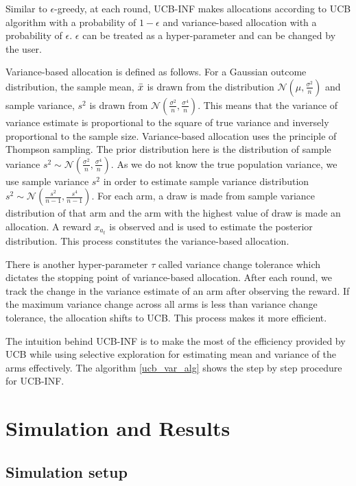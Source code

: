 \documentclass[12pt, letterpaper]{article}
\begin{document}
Similar to $\epsilon$-greedy, at each round, UCB-INF makes allocations according to UCB algorithm with a probability of $1-\epsilon$ and variance-based allocation with a probability of $\epsilon$. $\epsilon$ can be treated as a hyper-parameter and can be changed by the user.

Variance-based allocation is defined as follows. For a Gaussian outcome distribution, the sample mean, $\Bar{x}$ is drawn from the distribution $\mathcal{N}(\mu, \frac{\sigma^2}{n})$ and sample variance, $s^2$ is drawn from $\mathcal{N}( \frac{\sigma^2}{n}, \frac{\sigma^4}{n})$. This means that the variance of variance estimate is proportional to the square of true variance and inversely proportional to the sample size. Variance-based allocation uses the principle of Thompson sampling. The prior distribution here is the distribution of sample variance $s^2 \sim \mathcal{N}( \frac{\sigma^2}{n}, \frac{\sigma^4}{n})$. As we do not know the true population variance, we use sample variance $s^2$ in order to estimate sample variance distribution $s^2 \sim \mathcal{N}( \frac{s^2}{n-1}, \frac{s^4}{n-1})$. For each arm, a draw is made from sample variance distribution of that arm and the arm with the highest value of draw is made an allocation. A reward $x_{a_t}$ is observed and is used to estimate the posterior distribution. This process constitutes the variance-based allocation.

There is another hyper-parameter $\tau$ called variance change tolerance which dictates the stopping point of variance-based allocation. After each round, we track the change in the variance estimate of an arm after observing the reward. If the maximum variance change across all arms is less than variance change tolerance, the allocation shifts to UCB. This process makes it more efficient. 

The intuition behind UCB-INF is to make the most of the efficiency provided by UCB while using selective exploration for estimating mean and variance of the arms effectively. The algorithm \ref{ucb_var_alg} shows the step by step procedure for UCB-INF.


\section*{Simulation and Results}

\subsection*{Simulation setup}
\end{document}
